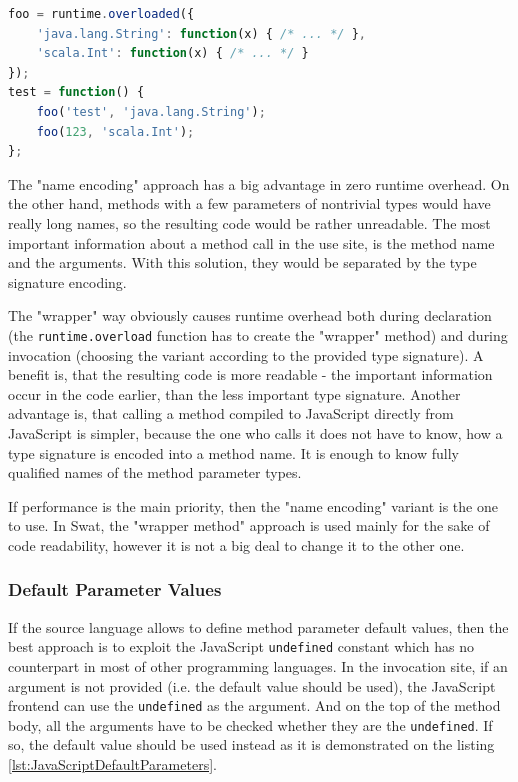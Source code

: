 \documentclass[12pt,a4paper]{report}
\begin{document}
\begin{minipage}{\linewidth}
\begin{lstlisting}[language=JavaScript,caption={Overloading in JavaScript.},label={lst:WrapperFunction}]
foo = runtime.overloaded({
	'java.lang.String': function(x) { /* ... */ },
	'scala.Int': function(x) { /* ... */ }
});
test = function() {
	foo('test', 'java.lang.String');
	foo(123, 'scala.Int');
};
\end{lstlisting}
\end{minipage}

The "name encoding" approach has a big advantage in zero runtime overhead. On the other hand, methods with a few parameters of nontrivial types would have really long names, so the resulting code would be rather unreadable. The most important information about a method call in the use site, is the method name and the arguments. With this solution, they would be separated by the type signature encoding.

The "wrapper" way obviously causes runtime overhead both during declaration (the \texttt{runtime.overload} function has to create the "wrapper" method) and during invocation (choosing the variant according to the provided type signature). A benefit is, that the resulting code is more readable - the important information occur in the code earlier, than the less important type signature. Another advantage is, that calling a method compiled to JavaScript directly from JavaScript is simpler, because the one who calls it does not have to know, how a type signature is encoded into a method name. It is enough to know fully qualified names of the method parameter types.

If performance is the main priority, then the "name encoding" variant is the one to use. In Swat, the "wrapper method" approach is used mainly for the sake of code readability, however it is not a big deal to change it to the other one.

\subsubsection*{Default Parameter Values}

If the source language allows to define method parameter default values, then the best approach is to exploit the JavaScript \texttt{undefined} constant which has no counterpart in most of other programming languages. In the invocation site, if an argument is not provided (i.e. the default value should be used), the JavaScript frontend can use the \texttt{undefined} as the argument. And on the top of the method body, all the arguments have to be checked whether they are the \texttt{undefined}. If so, the default value should be used instead as it is demonstrated on the listing \ref{lst:JavaScriptDefaultParameters}.
\end{document}
